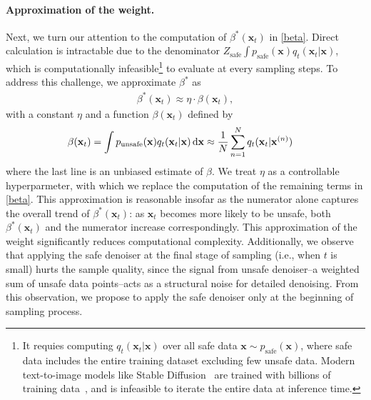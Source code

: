 \paragraph{Approximation of the weight.}
Next, we turn our attention to the computation of $\beta^{*}(\mathbf{x}_{t})$ in \eqref{beta}. Direct calculation is intractable due to the denominator $Z_{\text{safe}}\int p_{\text{safe}}(\mathbf{x})q_{t}(\mathbf{x}_{t}\vert\mathbf{x})$, which is computationally infeasible\footnote{It requies computing $q_{t}(\mathbf{x}_{t}\vert\mathbf{x})$ over all safe data $\mathbf{x}\sim p_{\text{safe}}(\mathbf{x})$, where safe data includes the entire training dataset excluding few unsafe data. Modern text-to-image models like Stable Diffusion~\cite{rombach2022high} are trained with billions of training data~\cite{schuhmann2022laion}, and is infeasible to iterate the entire data at inference time.} to evaluate at every sampling steps. 
%
To address this challenge, 
we approximate $\beta^*$ as
\begin{align*}
    \beta^*(\mathbf{x}_{t}) \approx \eta \cdot \beta(\mathbf{x}_{t}),
\end{align*}
with a constant $\eta$ and a function $\beta(\mathbf{x}_{t})$ defined by
%
\begin{align*}
    \beta(\mathbf{x}_{t})&=\int p_{\text{unsafe}}(\mathbf{x})q_{t}(\mathbf{x}_{t}\vert\mathbf{x})\mathop{}\!\mathrm{d}\mathbf{x}\approx \frac{1}{N}\sum_{n=1}^{N}q_{t}(\mathbf{x}_{t}\vert\mathbf{x}^{(n)}) 
\end{align*}
where the last line is an unbiased estimate of $\beta$. We treat $\eta$ as a controllable hyperparmeter, with which we replace the computation of the remaining terms in \eqref{beta}. 
%
This approximation is reasonable insofar as the numerator alone captures the overall trend of $\beta^{*}(\mathbf{x}_{t})$: as $\mathbf{x}_{t}$ becomes more likely to be unsafe, both $\beta^{*}(\mathbf{x}_{t})$ and the numerator increase correspondingly. This approximation of the weight significantly reduces computational complexity. Additionally, we observe that applying the safe denoiser at the final stage of sampling (i.e., when $t$ is small) hurts the sample quality, since the signal from unsafe denoiser--a weighted sum of unsafe data points--acts as a structural noise for detailed denoising. From this observation, we propose to apply the safe denoiser only at the beginning of sampling process.
%

%
%
%
%



